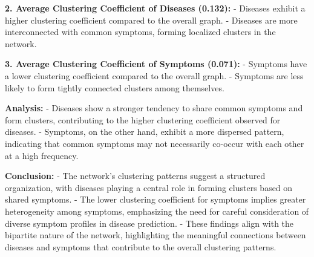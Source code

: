 \textbf{2. Average Clustering Coefficient of Diseases (0.132):}
   - Diseases exhibit a higher clustering coefficient compared to the overall graph.
   - Diseases are more interconnected with common symptoms, forming localized clusters in the network.

\textbf{3. Average Clustering Coefficient of Symptoms (0.071):}
   - Symptoms have a lower clustering coefficient compared to the overall graph.
   - Symptoms are less likely to form tightly connected clusters among themselves.

\textbf{Analysis:}
   - Diseases show a stronger tendency to share common symptoms and form clusters, contributing to the higher clustering coefficient observed for diseases.
   - Symptoms, on the other hand, exhibit a more dispersed pattern, indicating that common symptoms may not necessarily co-occur with each other at a high frequency.

\textbf{Conclusion:}
   - The network's clustering patterns suggest a structured organization, with diseases playing a central role in forming clusters based on shared symptoms.
   - The lower clustering coefficient for symptoms implies greater heterogeneity among symptoms, emphasizing the need for careful consideration of diverse symptom profiles in disease prediction.
   - These findings align with the bipartite nature of the network, highlighting the meaningful connections between diseases and symptoms that contribute to the overall clustering patterns.
